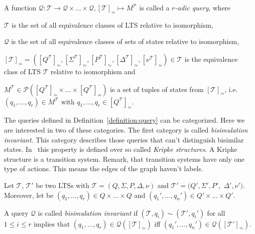 \begin{definition}
    \label{definition:query}
    A function $\mathcal{Q} : \mathscr{T} \rightarrow \mathscr{Q} \times \dots \times \mathscr{Q}, [\mathcal{T}]_\simeq
    \mapsto M^{\mathcal{T}}$ is called a
    \emph{$r$-adic query},
    where
    \begin{compactitem}
        \item $\mathscr{T}$ is the set of all equivalence classes of LTS relative to isomorphism,
        \item $\mathscr{Q}$ is the set of all equivalence classes of sets of states relative to isomorphism,
        \item $[\mathcal{T}]_\simeq = ([Q^\mathcal{T}]_\simeq, [\Sigma^\mathcal{T}]_\simeq, [P^\mathcal{T}]_\simeq,
        [\Delta^\mathcal{T}]_\simeq, [\nu^\mathcal{T}]_\simeq) \in \mathscr{T}$ is the equivalence class of LTS
        $\mathcal{T}$ relative to isomorphism and
        \item $M^{\mathcal{T}} \in \mathcal{P}([Q^\mathcal{T}]_\simeq \times \dots \times [Q^\mathcal{T}]_\simeq)$ is a
        set of tuples of states from $[\mathcal{T}]_\simeq$, i.e. $(q_1, \dots, q_r) \in M^{\mathcal{T}}$ with $q_1,
        \dots, q_r \in [Q^\mathcal{T}]_\simeq$.
    \end{compactitem}
\end{definition}

The queries defined in Definition~\ref{definition:query} can be categorized. Here we are interested in two of these
categories. The first category is called \textit{bisimulation invariant}. This category describes those queries that
can't distinguish bisimilar states. In~\cite{otto1999bisimulation} this property is defined over so called
\textit{Kripke structures}. A Kripke structure
is a transition system. Remark, that transition systems  have only one type of actions. This means the edges of the
graph haven't labels.

\begin{definition}
    \label{definition:bisimulationInvariant}
    Let $\mathcal{T}$, $\mathcal{T}'$ be two LTSs with $\mathcal{T} = (Q, \Sigma, P, \Delta, \nu)$
    and $\mathcal{T}' = (Q', \Sigma', P',$ $ \Delta', \nu')$. Moreover, let be $(q_1, \dots, q_r) \in Q \times \dots
    \times Q$ and $({q_1}', \dots, {q_n}') \in Q' \times \dots \times Q'$.

    A query $\mathcal{Q}$ is called \emph{bisimulation invariant} if $(\mathcal{T}, q_i) \sim (\mathcal{T}', q_i')$
    for all $1 \leq i \leq r$ implies that $(q_1, \dots, q_r) \in \mathcal{Q}([\mathcal{T}]_\simeq)$ iff $({q_1}',
    \dots, {q_n}') \in \mathcal{Q}([\mathcal{T}']_\simeq)$.
\end{definition}

